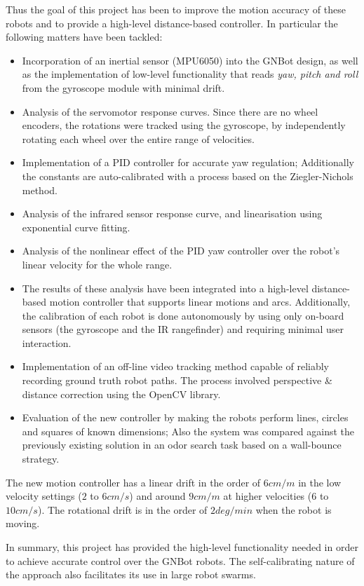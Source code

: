 \documentclass[12pt,twoside]{report}
\begin{document}
Thus the goal of this project has been to improve the motion accuracy of these robots and to provide a high-level distance-based controller.
In particular the following matters have been tackled:

\begin{itemize}
\item Incorporation of an inertial sensor (MPU6050) into the GNBot design, as well as the implementation of low-level functionality that reads \emph{yaw, pitch and roll} from the gyroscope module with minimal drift.
\item Analysis of the servomotor response curves. Since there are no wheel encoders, the rotations were tracked using the gyroscope, by independently rotating each wheel over the entire range of velocities.
\item Implementation of a PID controller for accurate yaw regulation; Additionally the constants are auto-calibrated with a process based on the Ziegler-Nichols method.
\item Analysis of the infrared sensor response curve, and linearisation using exponential curve fitting.
\item Analysis of the nonlinear effect of the PID yaw controller over the robot's linear velocity for the whole range.
\item The results of these analysis have been integrated into a high-level distance-based motion controller that supports linear motions and arcs. Additionally, the calibration of each robot is done autonomously by using only on-board sensors (the gyroscope and the IR rangefinder) and requiring minimal user interaction.
\item Implementation of an off-line video tracking method capable of reliably recording ground truth robot paths. The process involved perspective \& distance correction using the OpenCV library.
\item Evaluation of the new controller by making the robots perform lines, circles and squares of known dimensions; Also the system was compared against the previously existing solution in an odor search task based on a wall-bounce strategy.
\end{itemize}

The new motion controller has a linear drift in the order of $6cm/m$ in the low velocity settings ($2$ to $6cm/s$) and around $9cm/m$ at higher velocities ($6$ to $10cm/s$). The rotational drift is in the order of $2deg/min$ when the robot is moving.

In summary, this project has provided the high-level functionality needed in order to achieve accurate control over the GNBot robots. The self-calibrating nature of the approach also facilitates its use in large robot swarms.
\end{document}

